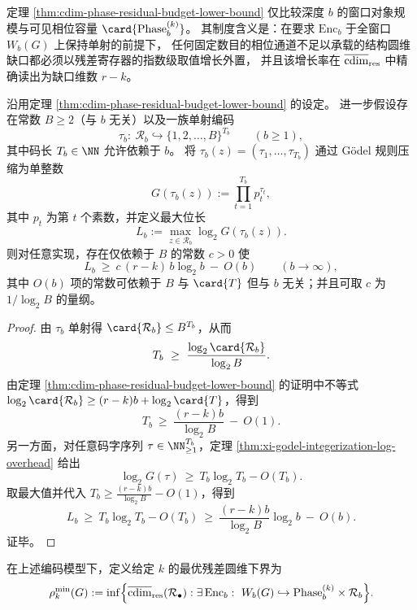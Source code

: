 \begin{remark}\label{rem:cdim-residual-budget-audit-meaning}
定理 \ref{thm:cdim-phase-residual-budget-lower-bound} 仅比较深度 \(b\) 的窗口对象规模与可见相位容量 \(\card{\mathrm{Phase}_b^{(k)}}\)。
其制度含义是：在要求 \(\mathrm{Enc}_b\) 于全窗口 \(W_b(G)\) 上保持单射的前提下，
任何固定数目的相位通道不足以承载的结构圆维缺口都必须以残差寄存器的指数级取值增长外置，
并且该增长率在 \(\overline{\operatorname{cdim}}_{\mathrm{res}}\) 中精确读出为缺口维数 \(r-k\)。
\end{remark}

\begin{theorem}\label{thm:cdim-restricted-prime-register-godel-bilogb-overhead}
沿用定理 \ref{thm:cdim-phase-residual-budget-lower-bound} 的设定。
进一步假设存在常数 \(B\ge 2\)（与 \(b\) 无关）以及一族单射编码
\[
\tau_b:\ \mathcal{R}_b\hookrightarrow \{1,2,\dots,B\}^{T_b}\qquad(b\ge 1),
\]
其中码长 \(T_b\in\NN\) 允许依赖于 \(b\)。
将 \(\tau_b(z)=(\tau_1,\dots,\tau_{T_b})\) 通过 Gödel 规则压缩为单整数
\[
G(\tau_b(z)):=\prod_{t=1}^{T_b} p_t^{\tau_t},
\]
其中 \(p_t\) 为第 \(t\) 个素数，并定义最大位长
\[
L_b:=\max_{z\in\mathcal{R}_b}\log_2 G(\tau_b(z)).
\]
则对任意实现，存在仅依赖于 \(B\) 的常数 \(c>0\) 使
\[
L_b\ \ge\ c\,(r-k)\,b\log_2 b\ -\ O(b)\qquad(b\to\infty),
\]
其中 \(O(b)\) 项的常数可依赖于 \(B\) 与 \(\card{T}\) 但与 \(b\) 无关；并且可取 \(c\) 为 \(1/\log_2 B\) 的量纲。
\end{theorem}
\begin{proof}
由 \(\tau_b\) 单射得 \(\card{\mathcal R_b}\le B^{T_b}\)，从而
\[
T_b\ \ge\ \frac{\log_2\card{\mathcal R_b}}{\log_2 B}.
\]
由定理 \ref{thm:cdim-phase-residual-budget-lower-bound} 的证明中不等式
\(\log_2\card{\mathcal R_b}\ge (r-k)b+\log_2\card{T}\)，得到
\[
T_b\ \ge\ \frac{(r-k)b}{\log_2 B}\ -\ O(1).
\]
另一方面，对任意码字序列 \(\tau\in\NN_{\ge 1}^{T_b}\)，定理 \ref{thm:xi-godel-integerization-log-overhead} 给出
\[
\log_2 G(\tau)\ \ge\ T_b\log_2 T_b-O(T_b).
\]
取最大值并代入 \(T_b\ge \frac{(r-k)b}{\log_2 B}-O(1)\)，得到
\[
L_b\ \ge\ T_b\log_2 T_b-O(T_b)\ \ge\ \frac{(r-k)b}{\log_2 B}\log_2 b\ -\ O(b).
\]
证毕。
\end{proof}

\begin{definition}[最优残差圆维下界]\label{def:cdim-min-residual-budget}
在上述编码模型下，定义给定 \(k\) 的最优残差圆维下界为
\[
\rho_k^{\min}(G)
:=\inf\Bigl\{\overline{\operatorname{cdim}}_{\mathrm{res}}(\mathcal{R}_\bullet):
\exists\,\mathrm{Enc}_b:\ W_b(G)\hookrightarrow \mathrm{Phase}_b^{(k)}\times \mathcal{R}_b\Bigr\}.
\]
\end{definition}

